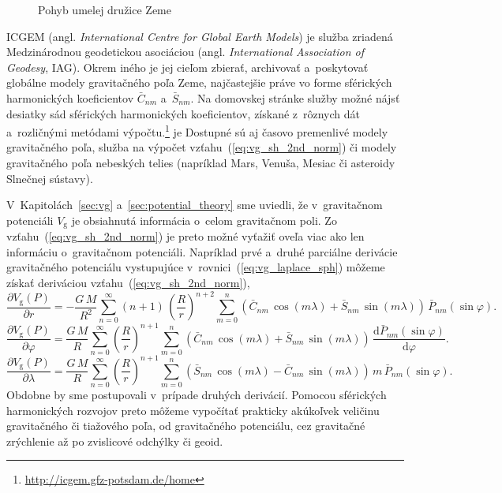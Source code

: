 \documentclass[a4paper,12pt]{book}
\newcommand{\diff}{\mathrm d}
\newcommand{\gidx}{\mathrm g}
\begin{document}
\begin{figure}
\centering

\caption{Pohyb umelej družice Zeme}
\label{fig:orbital_motion_real}
\end{figure}

ICGEM (angl. \emph{International Centre for Global Earth Models}) je služba 
zriadená Medzinárodnou geodetickou asociáciou (angl. \emph{International 
Association of Geodesy}, IAG).  Okrem iného je jej cieľom zbierať, archivovať 
a~poskytovať globálne modely gravitačného poľa Zeme, najčastejšie práve vo 
forme sférických harmonických koeficientov $\bar{C}_{nm}$ a~$\bar{S}_{nm}$.  Na 
domovskej stránke služby možné nájsť desiatky sád sférických harmonických 
koeficientov, získané z~rôznych dát a~rozličnými metódami 
výpočtu.\footnote{\url{http://icgem.gfz-potsdam.de/home}} je  Dostupné sú aj 
časovo premenlivé modely gravitačného poľa, služba na výpočet 
vzťahu~(\ref{eq:vg_sh_2nd_norm}) či modely gravitačného poľa nebeských telies 
(napríklad Mars, Venuša, Mesiac či asteroidy Slnečnej sústavy).

V~Kapitolách~\ref{sec:vg} a~\ref{sec:potential_theory} sme uviedli, že
v~gravitačnom potenciáli $V_\gidx$ je obsiahnutá informácia o~celom gravitačnom
poli.  Zo vzťahu~(\ref{eq:vg_sh_2nd_norm}) je preto možné vyťažiť oveľa viac
ako len informáciu o~gravitačnom potenciáli.  Napríklad prvé a~druhé parciálne 
derivácie gravitačného potenciálu vystupujúce 
v~rovnici~(\ref{eq:vg_laplace_sph}) môžeme získať deriváciou 
vzťahu~(\ref{eq:vg_sh_2nd_norm}),
%
\begin{equation}
\label{eq:vgr_sh_2nd_norm}
\frac{\partial V_\gidx(P)}{\partial r} = - \frac{G \, M}{R^2} \sum_{n
= 0}^\infty (n + 1) \, \left( \frac{R}{r} \right)^{n + 2} \sum_{m = 0}^{n}
\left( \bar{C}_{nm} \, \cos(m\lambda) + \bar{S}_{nm} \, \sin(m\lambda)\right)
\, \bar{P}_{nm}(\sin\varphi){.}
\end{equation}
%
\begin{equation}
\label{eq:vglat_sh_2nd_norm}
\frac{\partial V_\gidx(P)}{\partial \varphi} = \frac{G \, M}{R} \sum_{n
= 0}^\infty \left( \frac{R}{r} \right)^{n + 1} \sum_{m = 0}^{n} \left(
\bar{C}_{nm} \, \cos(m\lambda) + \bar{S}_{nm} \, \sin(m\lambda)\right) \,
\frac{\diff \bar{P}_{nm}(\sin\varphi)}{\diff \varphi}{.}
\end{equation}
%
\begin{equation}
\label{eq:vglon_sh_2nd_norm}
\frac{\partial V_\gidx(P)}{\partial \lambda} = \frac{G \, M}{R} \sum_{n
= 0}^\infty \left( \frac{R}{r} \right)^{n + 1} \sum_{m = 0}^{n}\left(
\bar{S}_{nm} \, \cos(m\lambda) - \bar{C}_{nm} \, \sin(m\lambda)\right) \, m \,
\bar{P}_{nm}(\sin\varphi){.}
\end{equation}
%
Obdobne by sme postupovali v~prípade druhých derivácií.  Pomocou sférických
harmonických rozvojov preto môžeme vypočítať prakticky akúkoľvek veličinu
gravitačného či tiažového poľa, od gravitačného potenciálu, cez gravitačné
zrýchlenie až po zvislicové odchýlky či geoid.
\end{document}
